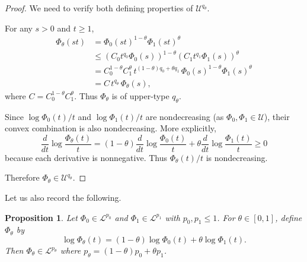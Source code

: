 \documentclass[12pt]{amsart}
\newtheorem{proposition}{Proposition}
\newcommand{\U}{\mathcal{U}}
\newcommand{\Lc}{\mathcal{L}}
\begin{document}
\begin{proof}
We need to verify both defining properties of $\U^{q_\theta}$.

For any $s>0$ and $t\ge 1$,
\begin{align*}
\Phi_\theta(st)
&= \Phi_0(st)^{1-\theta}\Phi_1(st)^\theta \\
&\le (C_0 t^{q_0}\Phi_0(s))^{1-\theta}(C_1 t^{q_1}\Phi_1(s))^\theta \\
&= C_0^{1-\theta}C_1^\theta \, t^{(1-\theta)q_0+\theta q_1} \, \Phi_0(s)^{1-\theta}\Phi_1(s)^\theta \\
&= C\, t^{q_\theta}\,\Phi_\theta(s),
\end{align*}
where $C=C_0^{1-\theta}C_1^\theta$. Thus $\Phi_\theta$ is of upper-type $q_\theta$.

Since $\log\Phi_0(t)/t$ and
$\log\Phi_1(t)/t$ are nondecreasing (as $\Phi_0,\Phi_1\in\U$), their convex
combination is also nondecreasing. More explicitly,
\[
\frac{d}{dt}\log\frac{\Phi_\theta(t)}{t}
= (1-\theta)\frac{d}{dt}\log\frac{\Phi_0(t)}{t}
+ \theta\frac{d}{dt}\log\frac{\Phi_1(t)}{t} \ge 0
\]
because each derivative is nonnegative.
Thus $\Phi_\theta(t)/t$ is nondecreasing.

Therefore $\Phi_\theta\in\U^{q_\theta}$.
\end{proof}
Let us also record the following.
\begin{proposition}\label{prop:interp-lower}
Let $\Phi_0\in\Lc^{p_0}$ and $\Phi_1\in\Lc^{p_1}$ with $p_0,p_1\le 1$. For
$\theta\in[0,1]$, define $\Phi_\theta$ by
\[
\log\Phi_\theta(t)=(1-\theta)\log\Phi_0(t)+\theta\log\Phi_1(t).
\]
Then $\Phi_\theta\in\Lc^{p_\theta}$ where $p_\theta=(1-\theta)p_0+\theta p_1$.
\end{proposition}
\end{document}

